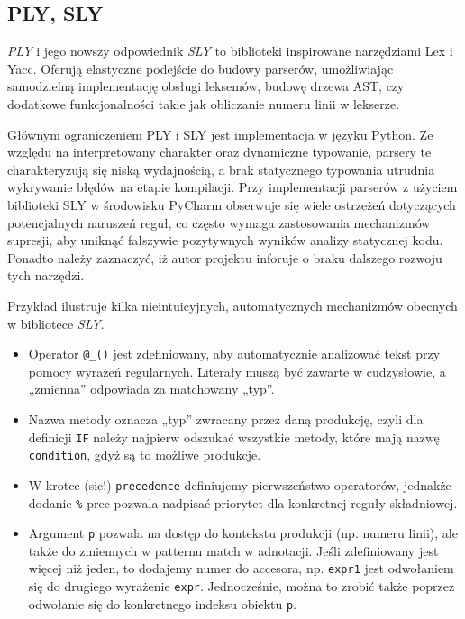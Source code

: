 \subsection{PLY, SLY}
\label{subsec:ply-sly}

\textit{PLY}\cite{ply} i jego nowszy odpowiednik \textit{SLY}\cite{sly} to biblioteki inspirowane narzędziami Lex i Yacc.
Oferują elastyczne podejście do budowy parserów, umożliwiając samodzielną implementację obsługi leksemów, budowę drzewa AST, czy dodatkowe funkcjonalności takie jak obliczanie numeru linii w lekserze.

Głównym ograniczeniem PLY i SLY jest implementacja w języku Python.
Ze względu na interpretowany charakter oraz dynamiczne typowanie, parsery te charakteryzują się niską wydajnością, a brak statycznego typowania utrudnia wykrywanie błędów na etapie kompilacji.
Przy implementacji parserów z użyciem biblioteki SLY w środowisku PyCharm obserwuje się wiele ostrzeżeń dotyczących potencjalnych naruszeń reguł, co często wymaga zastosowania mechanizmów supresji, aby uniknąć fałszywie pozytywnych wyników analizy statycznej kodu.
Ponadto należy zaznaczyć, iż autor projektu inforuje o braku dalszego rozwoju tych narzędzi\cite{sly-github}.

Przykład ilustruje kilka nieintuicyjnych, automatycznych mechanizmów obecnych w bibliotece \textit{SLY}.
\begin{itemize}
    \item Operator \verb|@_()| jest zdefiniowany, aby automatycznie analizować tekst przy pomocy wyrażeń regularnych.
    Literały muszą być zawarte w cudzysłowie, a „zmienna” odpowiada za matchowany „typ”.
    \item Nazwa metody oznacza „typ” zwracany przez daną produkcję, czyli dla definicji \verb|IF| należy najpierw odszukać wszystkie metody, które mają nazwę \verb|condition|, gdyż są to możliwe produkcje.
    \item W krotce (sic!) \verb|precedence| definiujemy pierwszeństwo operatorów, jednakże dodanie \verb|%| prec pozwala nadpisać priorytet dla konkretnej reguły składniowej.
    \item  Argument \verb|p| pozwala na dostęp do kontekstu produkcji (np. numeru linii), ale także do zmiennych w patternu match w adnotacji.
    Jeśli zdefiniowany jest więcej niż jeden, to dodajemy numer do accesora, np. \verb|expr1| jest odwołaniem się do drugiego wyrażenie \verb|expr|.
    Jednocześnie, można to zrobić także poprzez odwołanie się do konkretnego indeksu obiektu \verb|p|.
\end{itemize}

